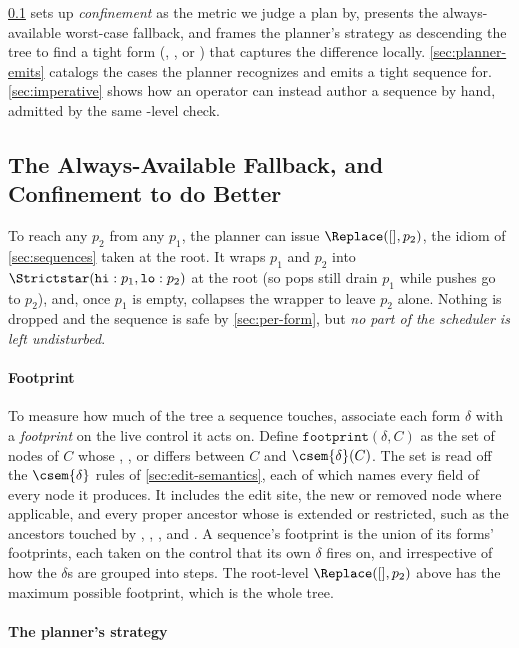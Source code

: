 \cref{sec:fallback} sets up \emph{confinement} as the metric we judge a plan by, presents the always-available worst-case \Replace{} fallback, and frames the planner's strategy as descending the tree to find a tight form (\Add, \Remove, or \ChangeMeta) that captures the difference locally.
\cref{sec:planner-emits} catalogs the cases the planner recognizes and emits a tight sequence for.
\cref{sec:imperative} shows how an operator can instead author a sequence by hand, admitted by the same \pol-level check.

\subsection{The Always-Available Fallback, and Confinement to do Better}\label{sec:fallback}

To reach any \(p_2\) from any \(p_1\), the planner can issue \(\Replace([], p_2)\), the idiom of \cref{sec:sequences} taken at the root.
It wraps \(p_1\) and \(p_2\) into \(\Strictstar(\mathtt{hi}: p_1, \mathtt{lo}: p_2)\) at the root (so pops still drain \(p_1\) while pushes go to \(p_2\)), and, once \(p_1\) is empty, collapses the wrapper to leave \(p_2\) alone.
Nothing is dropped and the sequence is safe by \cref{sec:per-form}, but \emph{no part of the scheduler is left undisturbed}.

\paragraph{Footprint}

To measure how much of the tree a sequence touches, associate each form \(\delta\) with a \emph{footprint} on the live control it acts on.
Define \(\mathtt{footprint}(\delta, C)\) as the set of nodes of \(C\) whose \stt, \pifo, or \zz differs between \(C\) and \(\csem{\delta}(C)\).
The set is read off the \(\csem{\delta}\) rules of \cref{sec:edit-semantics}, each of which names every field of every node it produces.
It includes the edit site, the new or removed node where applicable, and every proper ancestor whose \zz is extended or restricted, such as the ancestors touched by \Add, \Quiesce, \Remove, and \Designate.
A sequence's footprint is the union of its forms' footprints, each taken on the control that its own \(\delta\) fires on, and irrespective of how the \(\delta\)s are grouped into steps.
The root-level \(\Replace([], p_2)\) above has the maximum possible footprint, which is the whole tree.

\paragraph{The planner's strategy}

